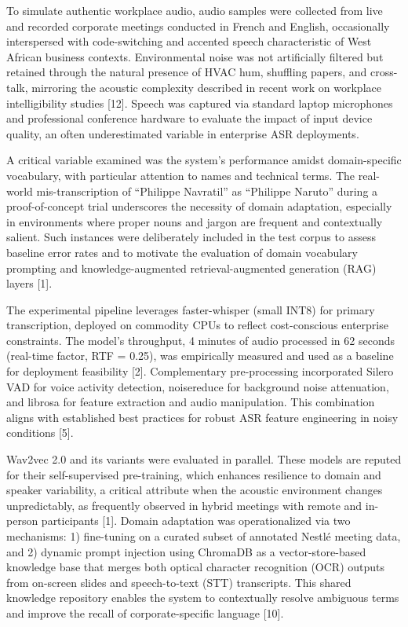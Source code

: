\documentclass[12pt,a4paper]{article}
\begin{document}
To simulate authentic workplace audio, audio samples were collected from live and recorded corporate meetings conducted in French and English, occasionally interspersed with code-switching and accented speech characteristic of West African business contexts. Environmental noise was not artificially filtered but retained through the natural presence of HVAC hum, shuffling papers, and cross-talk, mirroring the acoustic complexity described in recent work on workplace intelligibility studies [12]. Speech was captured via standard laptop microphones and professional conference hardware to evaluate the impact of input device quality, an often underestimated variable in enterprise ASR deployments.


A critical variable examined was the system’s performance amidst domain-specific vocabulary, with particular attention to names and technical terms. The real-world mis-transcription of “Philippe Navratil” as “Philippe Naruto” during a proof-of-concept trial underscores the necessity of domain adaptation, especially in environments where proper nouns and jargon are frequent and contextually salient. Such instances were deliberately included in the test corpus to assess baseline error rates and to motivate the evaluation of domain vocabulary prompting and knowledge-augmented retrieval-augmented generation (RAG) layers [1].


The experimental pipeline leverages faster-whisper (small INT8) for primary transcription, deployed on commodity CPUs to reflect cost-conscious enterprise constraints. The model’s throughput, 4 minutes of audio processed in 62 seconds (real-time factor, RTF = 0.25), was empirically measured and used as a baseline for deployment feasibility [2]. Complementary pre-processing incorporated Silero VAD for voice activity detection, noisereduce for background noise attenuation, and librosa for feature extraction and audio manipulation. This combination aligns with established best practices for robust ASR feature engineering in noisy conditions [5].


Wav2vec 2.0 and its variants were evaluated in parallel. These models are reputed for their self-supervised pre-training, which enhances resilience to domain and speaker variability, a critical attribute when the acoustic environment changes unpredictably, as frequently observed in hybrid meetings with remote and in-person participants [1]. Domain adaptation was operationalized via two mechanisms: 1) fine-tuning on a curated subset of annotated Nestlé meeting data, and 2) dynamic prompt injection using ChromaDB as a vector-store-based knowledge base that merges both optical character recognition (OCR) outputs from on-screen slides and speech-to-text (STT) transcripts. This shared knowledge repository enables the system to contextually resolve ambiguous terms and improve the recall of corporate-specific language [10].
\end{document}
